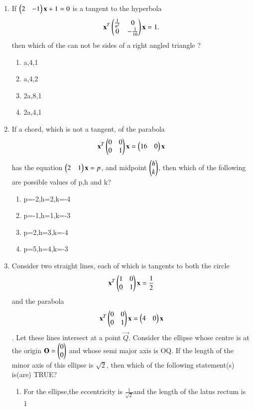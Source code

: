 \begin{enumerate}[label=\arabic*.,ref=\thesubsection.\theenumi]
    \item If $\begin{pmatrix}2&-1\end{pmatrix}\mathbf{x}+1=0$ is a tangent to the hyperbola 
    \begin{align}
    \mathbf{x}^T\begin{pmatrix}\frac{1}{a^2}&0\\0&-\frac{1}{16}\end{pmatrix}\mathbf{x}=1.
    \end{align} then which of the can not be sides of a right angled triangle ?
    \begin{enumerate}
    \item a,4,1
    \item a,4,2
    \item 2a,8,1
    \item 2a,4,1
    \end{enumerate}
    \item If a chord, which is not a tangent, of the parabola
    \begin{align}
    \mathbf{x}^T\begin{pmatrix}0&0\\0&1\end{pmatrix}\mathbf{x}=\begin{pmatrix}16&0\end{pmatrix}\mathbf{x}
    \end{align} has the equation $\begin{pmatrix}2&1\end{pmatrix}\mathbf{x}=p$, and midpoint $\begin{pmatrix}h\\k\end{pmatrix}$, then which of the following are possible values of p,h and k?
    \begin{enumerate}
    \item p=-2,h=2,k=-4
    \item p=-1,h=1,k=-3
    \item p=2,h=3,k=-4
    \item p=5,h=4,k=-3
    \end{enumerate}
    \item Consider two straight lines, each of which is tangents to both the circle
    \begin{align}
    \mathbf{x}^T\begin{pmatrix}1&0\\0&1\end{pmatrix}\mathbf{x}=\frac{1}{2}
    \end{align} and the parabola 
    \begin{align} 
    \mathbf{x}^T\begin{pmatrix}0&0\\0&1\end{pmatrix}\mathbf{x}=\begin{pmatrix}4&0\end{pmatrix}\mathbf{x}
    \end{align}. Let these lines intersect at a point $\vec{Q}$. Consider the ellipse whose centre is 	at the origin $\mathbf{O}=\begin{pmatrix}0\\0\end{pmatrix}$ and whose semi major axis is OQ. If the length of the minor 		axis of this ellipse is $\sqrt{2}$, then which of the following statement(s) is(are) TRUE?
    \begin{enumerate}
    \item For the ellipse,the eccentricity is $\frac{1}{\sqrt{2}}$and the length of the latus rectum 		is 1

\end{enumerate}
\end{enumerate}
